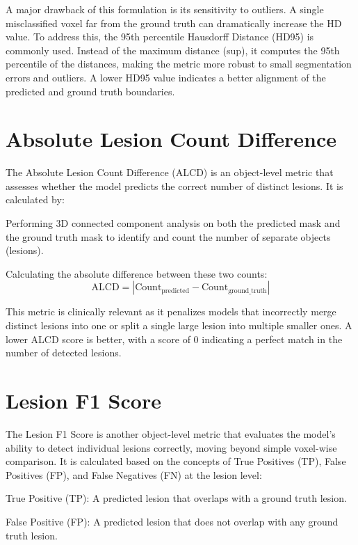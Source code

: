 A major drawback of this formulation is its sensitivity to outliers. A single misclassified voxel far from the ground truth can dramatically increase the HD value. To address this, the 95th percentile Hausdorff Distance (HD95) is commonly used. Instead of the maximum distance (sup), it computes the 95th percentile of the distances, making the metric more robust to small segmentation errors and outliers. A lower HD95 value indicates a better alignment of the predicted and ground truth boundaries.

\section{Absolute Lesion Count Difference}
\label{sec:lesion_count_difference}

The Absolute Lesion Count Difference (ALCD) is an object-level metric that assesses whether the model predicts the correct number of distinct lesions. It is calculated by:

Performing 3D connected component analysis on both the predicted mask and the ground truth mask to identify and count the number of separate objects (lesions).

Calculating the absolute difference between these two counts:
\begin{equation}
\text{ALCD} = | \text{Count}_{\text{predicted}} - \text{Count}_{\text{ground\_truth}} |
\end{equation}

This metric is clinically relevant as it penalizes models that incorrectly merge distinct lesions into one or split a single large lesion into multiple smaller ones. A lower ALCD score is better, with a score of 0 indicating a perfect match in the number of detected lesions.

\section{Lesion F1 Score}
\label{sec:lesion_f1_score}

The Lesion F1 Score is another object-level metric that evaluates the model's ability to detect individual lesions correctly, moving beyond simple voxel-wise comparison. It is calculated based on the concepts of True Positives (TP), False Positives (FP), and False Negatives (FN) at the lesion level:

True Positive (TP): A predicted lesion that overlaps with a ground truth lesion.

False Positive (FP): A predicted lesion that does not overlap with any ground truth lesion.


